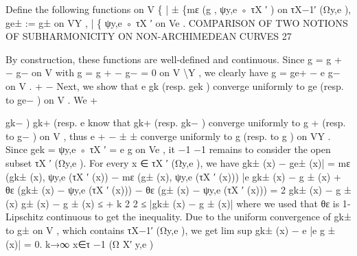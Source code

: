 \documentclass[
  10pt,
]{article}
\newenvironment{Shaded}{}{}
\newcommand{\NormalTok}[1]{#1}
\begin{document}
\begin{Shaded}
\begin{Highlighting}[]
\NormalTok{     Define the following functions on V}
\NormalTok{                                \{}
\NormalTok{                                |       ±}
\NormalTok{                                \{mε (g , ψy,e ◦ τX ′ )       on τX−1′ (Ωy,e ),}
\NormalTok{                         ge± := g±                           on VY ,}
\NormalTok{                                |}
\NormalTok{                                \{}
\NormalTok{                                  ψy,e ◦ τX ′                on Ve .}
\NormalTok{   COMPARISON OF TWO NOTIONS OF SUBHARMONICITY ON NON{-}ARCHIMEDEAN CURVES 27}


\NormalTok{  By construction, these functions are well{-}defined and continuous. Since g = g + − g−}
\NormalTok{on V with g = g + − g− = 0 on V \textbackslash{}Y , we clearly have g = ge+ − e    g− on V .}
\NormalTok{                           +         −}
\NormalTok{  Next, we show that e   gk (resp. gek ) converge uniformly to ge (resp. to ge− ) on V . We}
\NormalTok{                                                                 +}

\NormalTok{                                                                                           gk− )}
\NormalTok{                                                                                gk+ (resp. e}
\NormalTok{know that gk+ (resp. gk− ) converge uniformly to g + (resp. to g− ) on V , thus e}
\NormalTok{                           +             −                  ±                      ±}
\NormalTok{converge uniformly to g (resp. to g ) on VY . Since gek = ψy,e ◦ τX ′ = e        g on Ve , it}
\NormalTok{                                          −1                        −1}
\NormalTok{remains to consider the open subset τX ′ (Ωy,e ). For every x ∈ τX ′ (Ωy,e ), we have}
\NormalTok{ gk± (x) − ge± (x)| = mε (gk± (x), ψy,e (τX ′ (x)) − mε (g± (x), ψy,e (τX ′ (x)))}
\NormalTok{|e}
\NormalTok{                       gk± (x) − g ± (x) + θε (gk± (x) − ψy,e (τX ′ (x))) − θε (g± (x) − ψy,e (τX ′ (x)))}
\NormalTok{                   =}
\NormalTok{                                                               2}
\NormalTok{                       gk± (x) − g ± (x)   g± (x) − g ± (x)}
\NormalTok{                   ≤                     + k}
\NormalTok{                               2                  2}
\NormalTok{                   ≤ |gk± (x) − g ± (x)|}
\NormalTok{where we used that θε is 1{-}Lipschitz continuous to get the inequality. Due to the uniform}
\NormalTok{convergence of gk± to g± on V , which contains τX−1′ (Ωy,e ), we get}
\NormalTok{                               lim      sup            gk± (x) − e}
\NormalTok{                                                      |e         g ± (x)| = 0.}
\NormalTok{                              k→∞ x∈τ −1 (Ω}
\NormalTok{                                       X′     y,e )}



\end{Highlighting}
\end{Shaded}
\end{document}
